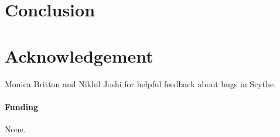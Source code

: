 \documentclass{bioinfo}
\begin{document}
\section{Conclusion}

\section*{Acknowledgement}
Monica Britton and Nikhil Joshi for helpful feedback about bugs in
Scythe. 

\paragraph{Funding\textcolon} None.



% 
% 
% 
% 


\end{document}
